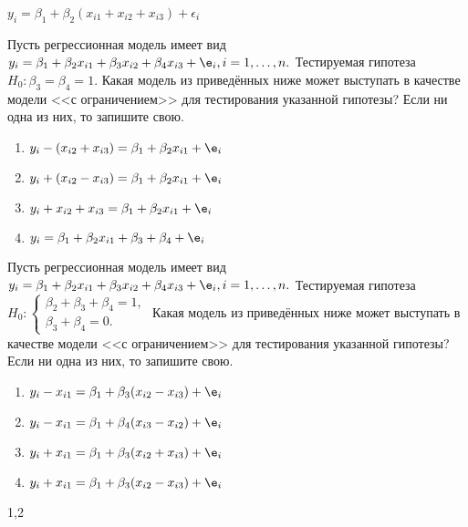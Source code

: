 \documentclass[pdftex,11pt,openany]{book}\usepackage[]{graphicx}\usepackage[]{color}
\begin{document}
\begin{solution}
$y_i=\beta_1+\beta_2(x_{i1}+x_{i2}+x_{i3})+\epsilon_{i}$
\end{solution}


\begin{problem}
 Пусть регрессионная модель имеет вид $y_i= \beta_1+ \beta_2 x_{i1}+ \beta_3 x_{i2}+ \beta_4 x_{i3}+\e_i, i=1,\dots,n.$ Тестируемая гипотеза $H_0: \beta_3= \beta_4=1.$ Какая модель из приведённых ниже может выступать в качестве модели <<с ограничением>> для тестирования указанной гипотезы? Если ни одна из них, то запишите свою.
\begin{enumerate}
\item $y_i-(x_{i2}+x_{i3}) = \beta_1+ \beta_2 x_{i1}+ \e_i$
\item $y_i+(x_{i2}-x_{i3}) = \beta_1+ \beta_2 x_{i1}+ \e_i$
\item $y_i+x_{i2}+x_{i3} = \beta_1+ \beta_2 x_{i1}+ \e_i$
\item $y_i= \beta_1+ \beta_2 x_{i1}+ \beta_3 + \beta_4 + \e_i$
\end{enumerate}
\end{problem}

\begin{solution}
\end{solution}


\begin{problem}
 Пусть регрессионная модель имеет вид $y_i= \beta_1+ \beta_2 x_{i1}+ \beta_3 x_{i2}+ \beta_4 x_{i3}+\e_i, i=1,\dots,n.$ Тестируемая гипотеза 
$H_0: 
  \begin{cases}
    \beta_2+ \beta_3+ \beta_4=1, \\
    \beta_3+ \beta_4=0. 
 \end{cases}$
Какая модель из приведённых ниже может выступать в качестве модели <<с ограничением>> для тестирования указанной гипотезы? Если ни одна из них, то запишите свою.
\begin{enumerate}
\item $y_i-x_{i1} = \beta_1+ \beta_3 (x_{i2}-x_{i3})+ \e_i$
\item $y_i-x_{i1} = \beta_1+ \beta_4 (x_{i3}-x_{i2})+ \e_i$
\item $y_i+x_{i1} = \beta_1+ \beta_3 (x_{i2}+x_{i3})+ \e_i$
\item $y_i+x_{i1} = \beta_1+ \beta_3 (x_{i2}-x_{i3})+ \e_i$
\end{enumerate}
\end{problem}

\begin{solution}
1,2
\end{solution}
\end{document}
